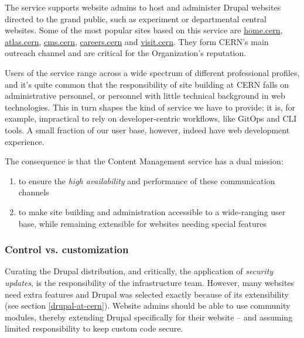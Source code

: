 The service supports website admins to host and administer Drupal websites directed to the grand public,
such as experiment or departmental central websites.
Some of the most popular sites based on this service are \href{https://home.cern/}{home.cern}, \href{https://atlas.cern}{atlas.cern},
\href{https://cms.cern}{cms.cern}, \href{https://careers.cern}{careers.cern} and \href{https://visit.cern}{visit.cern}.
They form CERN's main outreach channel and are critical for the Organization's reputation.

Users of the service range across a wide spectrum of different professional profiles,
and it's quite common that the responsibility of site building at CERN falls on administrative personnel, or personnel with little technical background in web technologies.
This in turn shapes the kind of service we have to provide; it is, for example, impractical to rely on developer-centric workflows, like GitOps and CLI tools.
A small fraction of our user base, however, indeed have web development experience.

The consequence is that the Content Management service has a dual mission:
\begin{enumerate}
    \item to ensure the \emph{high availability} and performance of these communication channels
    \item to make site building and administration accessible to a wide-ranging user base, while remaining extensible for websites needing special features
\end{enumerate}


\subsubsection*{Control vs. customization}

Curating the Drupal distribution, and critically, the application of \emph{security updates}, is the responsibility of the infrastructure team.
However, many websites need extra features and Drupal was selected exactly because of its extensibility (see section \ref{drupal-at-cern}).
Website admins should be able to use community modules, thereby extending Drupal specifically for their website -- and assuming limited responsibility to keep custom code secure.

